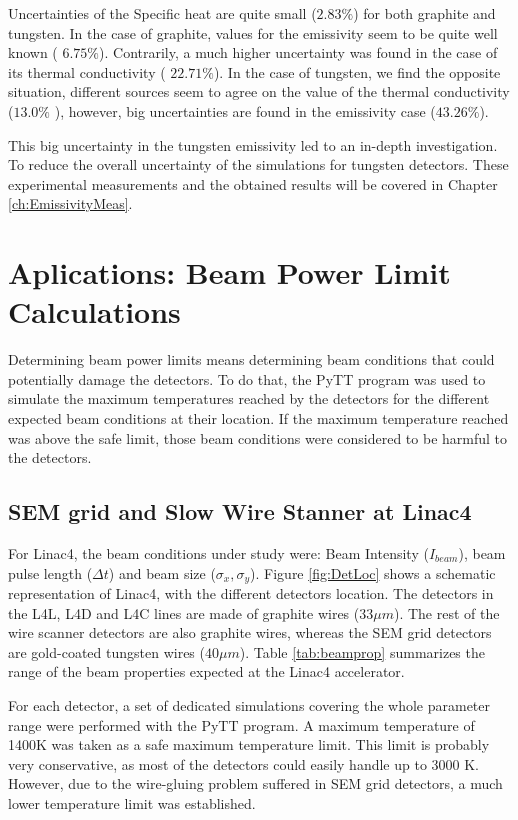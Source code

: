 Uncertainties of the Specific heat are quite small ($2.83 \% $) for both graphite and tungsten. In the case of graphite, values for the emissivity seem to be quite well known ( $ 6.75\%$). Contrarily, a much higher uncertainty was found in the case of its thermal conductivity ( $ 22.71\%$). In the case of tungsten, we find the opposite situation, different sources seem to agree on the value of the thermal conductivity ($13.0\%$ ), however, big uncertainties are found in the emissivity case ($43.26 \%$). 

This big uncertainty in the tungsten emissivity led to an in-depth investigation. To reduce the overall uncertainty of the simulations for tungsten detectors. These experimental measurements and the obtained results will be covered in Chapter \ref{ch:EmissivityMeas}.

\section{Aplications: Beam Power Limit Calculations}

Determining beam power limits means determining beam conditions that could potentially damage the detectors. To do that, the PyTT program was used to simulate the maximum temperatures reached by the detectors for the different expected beam conditions at their location. If the maximum temperature reached was above the safe limit, those beam conditions were considered to be harmful to the detectors. 

\subsection{SEM grid and Slow Wire Stanner at Linac4}

For Linac4, the beam conditions under study were: Beam Intensity ($I_{beam}$), beam pulse length ($\Delta t$) and beam size ($\sigma_x , \sigma_y$). Figure \ref{fig:DetLoc} shows a schematic representation of Linac4, with the different detectors location. The detectors in the L4L, L4D and L4C lines are made of graphite wires ($33 \mu m$). The rest of the wire scanner detectors are also graphite wires, whereas the SEM grid detectors are gold-coated tungsten wires ($40 \mu m$). Table \ref{tab:beamprop} summarizes the range of the beam properties expected at the Linac4 accelerator.

For each detector, a set of dedicated simulations covering the whole parameter range were performed with the PyTT program. A maximum temperature of 1400K was taken as a safe maximum temperature limit. This limit is probably very conservative, as most of the detectors could easily handle up to 3000 K. However, due to the wire-gluing problem suffered in SEM grid detectors, a much lower temperature limit was established. 

